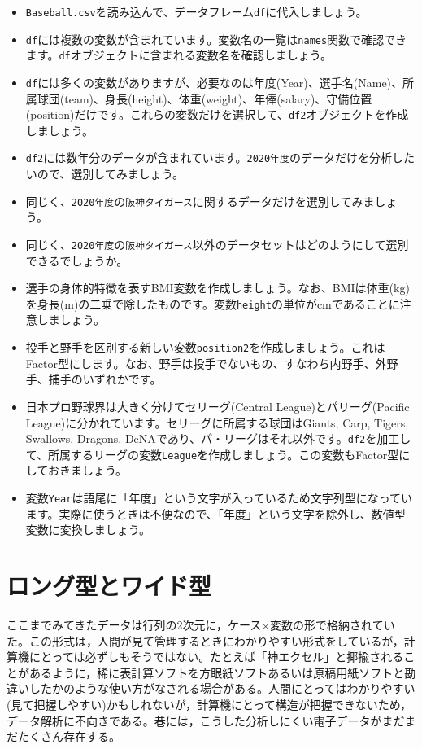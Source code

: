 \documentclass[
  a4paper,
]{ltjsbook}
\providecommand{\tightlist}{%
  \setlength{\itemsep}{0pt}\setlength{\parskip}{0pt}}
\begin{document}
\begin{itemize}
\tightlist
\item
  \texttt{Baseball.csv}を読み込んで、データフレーム\texttt{df}に代入しましょう。
\item
  \texttt{df}には複数の変数が含まれています。変数名の一覧は\texttt{names}関数で確認できます。\texttt{df}オブジェクトに含まれる変数名を確認しましょう。
\item
  \texttt{df}には多くの変数がありますが、必要なのは年度(Year)、選手名(Name)、所属球団(team)、身長(height)、体重(weight)、年俸(salary)、守備位置(position)だけです。これらの変数だけを選択して、\texttt{df2}オブジェクトを作成しましょう。
\item
  \texttt{df2}には数年分のデータが含まれています。\texttt{2020年度}のデータだけを分析したいので、選別してみましょう。
\item
  同じく、\texttt{2020年度}の\texttt{阪神タイガース}に関するデータだけを選別してみましょう。
\item
  同じく、\texttt{2020年度}の\texttt{阪神タイガース}以外のデータセットはどのようにして選別できるでしょうか。
\item
  選手の身体的特徴を表すBMI変数を作成しましょう。なお、BMIは体重(kg)を身長(m)の二乗で除したものです。変数\texttt{height}の単位がcmであることに注意しましょう。
\item
  投手と野手を区別する新しい変数\texttt{position2}を作成しましょう。これはFactor型にします。なお、野手は投手でないもの、すなわち内野手、外野手、捕手のいずれかです。
\item
  日本プロ野球界は大きく分けてセリーグ(Central League)とパリーグ(Pacific
  League)に分かれています。セリーグに所属する球団はGiants, Carp, Tigers,
  Swallows, Dragons,
  DeNAであり、パ・リーグはそれ以外です。\texttt{df2}を加工して、所属するリーグの変数\texttt{League}を作成しましょう。この変数もFactor型にしておきましょう。
\item
  変数\texttt{Year}は語尾に「年度」という文字が入っているため文字列型になっています。実際に使うときは不便なので、「年度」という文字を除外し、数値型変数に変換しましょう。
\end{itemize}

\section{ロング型とワイド型}\label{sec-Long_and_Wide}

ここまでみてきたデータは行列の2次元に，ケース\(\times\)変数の形で格納されていた。この形式は，人間が見て管理するときにわかりやすい形式をしているが，計算機にとっては必ずしもそうではない。たとえば「神エクセル」と揶揄されることがあるように，稀に表計算ソフトを方眼紙ソフトあるいは原稿用紙ソフトと勘違いしたかのような使い方がなされる場合がある。人間にとってはわかりやすい(見て把握しやすい)かもしれないが，計算機にとって構造が把握できないため，データ解析に不向きである。巷には，こうした分析しにくい電子データがまだまだたくさん存在する。
\end{document}
